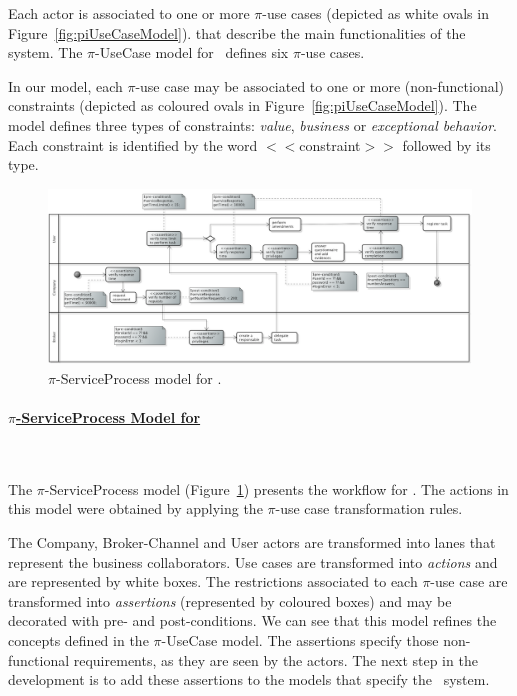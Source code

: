 Each actor is associated to one or more $\pi$-use cases (depicted as white ovals in Figure~\ref{fig:piUseCaseModel}). 
that describe the main functionalities of the system.
The $\pi$-UseCase model for \FlyingPig\ defines six $\pi$-use cases. 

In our model, each $\pi$-use case may be associated to one or more (non-functional) constraints (depicted as coloured ovals in Figure~\ref{fig:piUseCaseModel}). 
The model defines three types of constraints: \textit{value}, \textit{business} or \textit{exceptional behavior}. 
Each constraint is identified by the word $<<$\textsf{constraint}$>>$ followed by its type.


\begin{figure}
\centering
\includegraphics[width=1.0\textwidth]{figs/ServiceProcessGeneralCut.png}
\caption{$\pi$-ServiceProcess model for \FlyingPig.\label{fig:PiServiceProcessModel}}
\end{figure}
 
\paragraph{\underline{$\pi$-ServiceProcess Model for \FlyingPig}}~

The $\pi$-ServiceProcess model (Figure~\ref{fig:PiServiceProcessModel}) presents the workflow for \FlyingPig.
The actions in this model were obtained by applying the $\pi$-use case transformation rules.

The \textsf{Company}, \textsf{Broker-Channel} and \textsf{User} actors are transformed into lanes that represent the business collaborators.
Use cases are transformed into \textit{actions} and are represented by white boxes.
The restrictions associated to each $\pi$-use case are transformed into \textit{assertions} (represented by coloured boxes) and may be decorated with pre- and post-conditions. 
We can see that this model refines the concepts defined in the $\pi$-UseCase model.
The assertions specify those non-functional requirements, as they are seen by the actors. 
The next step in the development is to add these assertions to the models that specify the \FlyingPig\ system.

